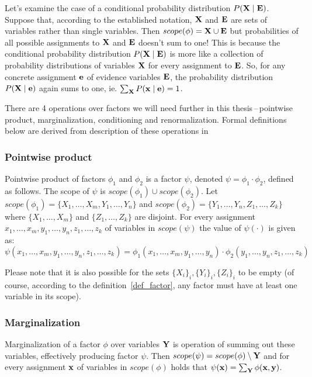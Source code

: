 \documentclass[english,cover]{fitthesis} %
\newcommand{\vars}[1]{{\bold{#1}}}         %
\begin{document}
Let's examine the case of a conditional probability distribution $P(\vars{X}\mid\vars{E})$. Suppose that, according to the established notation, $\vars{X}$ and $\vars{E}$ are sets of variables rather than single variables. Then $scope(\phi) = \vars{X} \cup \vars{E}$ but probabilities of all possible assignments to $\vars{X}$ and $\vars{E}$ doesn't sum to one! This is because the conditional probability distribution $P(\vars{X}\mid\vars{E})$ is more like a collection of probability distributions of variables $\vars{X}$ for every assignment to $\vars{E}$. So, for any concrete assignment $\vars{e}$ of evidence variables $\vars{E}$, the probability distribution $P(\vars{X}\mid\vars{e})$ again sums to one, ie. $\sum_\vars{X} P(\vars{x}\mid\vars{e}) = 1$.

\medskip
There are 4 operations over factors we will need further in this thesis\,--\,pointwise product, marginalization, conditioning and renormalization. Formal definitions below are derived from description of these operations in~\cite{russell_norvig_ed2, pgm}

\subsubsection{Pointwise product}
Pointwise product of factors $\phi_1$ and $\phi_2$ is a factor $\psi$, denoted $\psi = \phi_1 \cdot \phi_2$, defined as follows. The scope of $\psi$ is $scope(\phi_1) \cup scope(\phi_2)$. Let $scope(\phi_1) = \lbrace X_1, \dots, X_m, Y_1, \dots, Y_n \rbrace$ and $scope(\phi_2) = \lbrace Y_1, \dots, Y_n, Z_1, \dots, Z_k \rbrace$ where $\lbrace X_1, \dots, X_m \rbrace$ and $\lbrace Z_1, \dots, Z_k \rbrace$ are disjoint. For every assignment $x_1, \dots, x_m, y_1, \dots, y_n, z_1, \dots, z_k$ of variables in $scope(\psi)$ the value of $\psi(\cdot)$ is given as:
$$\psi(x_1, \dots, x_m, y_1, \dots, y_n, z_1, \dots, z_k)
= \phi_1(x_1, \dots, x_m, y_1, \dots, y_n) \cdot \phi_2(y_1, \dots, y_n, z_1, \dots, z_k)
$$

Please note that it is also possible for the sets $\lbrace X_i \rbrace_i, \lbrace Y_i \rbrace_i,\lbrace Z_i \rbrace_i$ to be empty (of course, according to the definition~\ref{def_factor}, any factor must have at least one variable in its scope).

\subsubsection{Marginalization}
Marginalization of a factor $\phi$ over variables $\vars{Y}$ is operation of summing out these variables, effectively producing factor $\psi$. Then $scope(\psi) = scope(\phi) \setminus \vars{Y}$ and for every assignment $\vars{x}$ of variables in $scope(\phi)$ holds that $\psi(\vars{x}) = \sum_\vars{Y} \phi(\vars{x},\vars{y})$.
\end{document}
